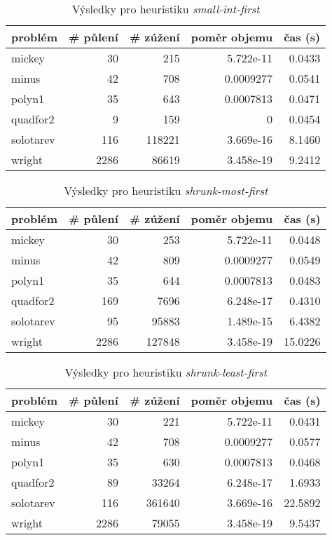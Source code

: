 {\begin{table}[H]
\centering
\begin{tabular}{lrrrr}
\hline
problém & \# půlení & \# zúžení & poměr objemu & čas (s) \\ \hline
mickey & 30 & 215 & 5.722e-11 & 0.0433 \\
minus & 42 & 708 & 0.0009277 & 0.0541 \\
polyn1 & 35 & 643 & 0.0007813 & 0.0471 \\
quadfor2 & 9 & 159 & 0 & 0.0454 \\
solotarev & 116 & 118221 & 3.669e-16 & 8.1460 \\
wright & 2286 & 86619 & 3.458e-19 & 9.2412 \\
\end{tabular}
\caption{Výsledky pro heuristiku \emph{small-int-first}}
\label{small-int-first}
\end{table}



\begin{table}[H]
\centering
\begin{tabular}{lrrrr}
\hline
problém & \# půlení & \# zúžení & poměr objemu & čas (s) \\ \hline
mickey & 30 & 253 & 5.722e-11 & 0.0448 \\
minus & 42 & 809 & 0.0009277 & 0.0549 \\
polyn1 & 35 & 644 & 0.0007813 & 0.0483 \\
quadfor2 & 169 & 7696 & 6.248e-17 & 0.4310 \\
solotarev & 95 & 95883 & 1.489e-15 & 6.4382 \\
wright & 2286 & 127848 & 3.458e-19 & 15.0226 \\
\end{tabular}
\caption{Výsledky pro heuristiku \emph{shrunk-most-first}}
\label{shrunk-most-first}
\end{table}



\begin{table}[H]
\centering
\begin{tabular}{lrrrr}
\hline
problém & \# půlení & \# zúžení & poměr objemu & čas (s) \\ \hline
mickey & 30 & 221 & 5.722e-11 & 0.0431 \\
minus & 42 & 708 & 0.0009277 & 0.0577 \\
polyn1 & 35 & 630 & 0.0007813 & 0.0468 \\
quadfor2 & 89 & 33264 & 6.248e-17 & 1.6933 \\
solotarev & 116 & 361640 & 3.669e-16 & 22.5892 \\
wright & 2286 & 79055 & 3.458e-19 & 9.5437 \\
\end{tabular}
\caption{Výsledky pro heuristiku \emph{shrunk-least-first}}
\label{shrunk-least-first}
\end{table}



}
